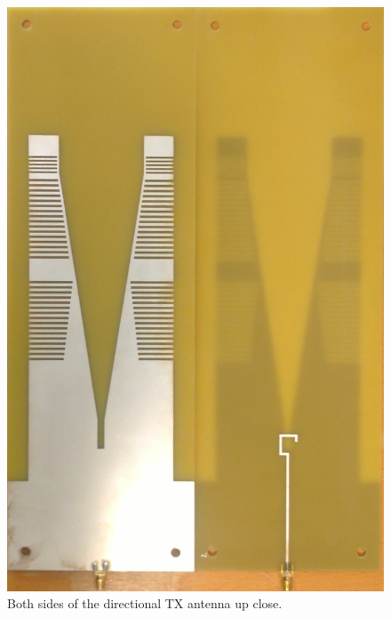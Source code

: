 \begin{figure}[H]
\begin{minipage}[H]{0.4\textwidth}
    \includegraphics[width=\textwidth]{pictures/Measurement/dirrecional_antenna.jpg}
    \caption{Both sides of the directional TX antenna up close.}
  \end{minipage}
\end{figure}



